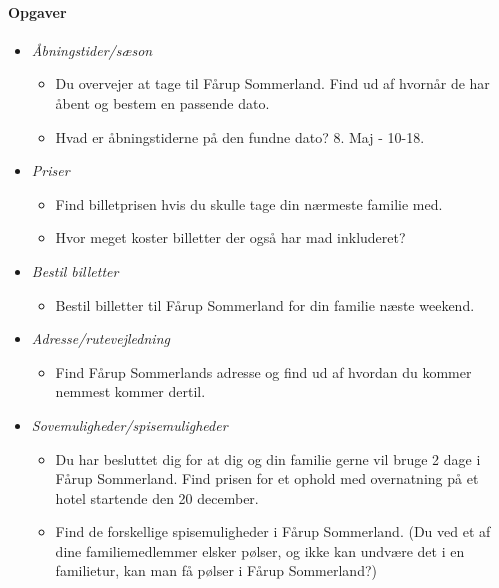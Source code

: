 \documentclass[10pt,a4paper]{article}      %
\begin{document}
\paragraph{Opgaver}
\begin{itemize}
\item {\it Åbningstider/sæson}
    \begin{itemize}
    \item Du overvejer at tage til Fårup Sommerland. Find ud af hvornår de har
    åbent og bestem en passende dato.
    \item Hvad er åbningstiderne på den fundne dato? 8. Maj - 10-18.
    \end{itemize}

\item {\it Priser}
    \begin{itemize}
    \item Find billetprisen hvis du skulle tage din nærmeste familie med.
    \item Hvor meget koster billetter der også har mad inkluderet?
    \end{itemize}

\item {\it Bestil billetter}
    \begin{itemize}
    \item Bestil billetter til Fårup Sommerland for din familie næste weekend.
    \end{itemize}

\item {\it Adresse/rutevejledning}
    \begin{itemize}
    \item Find Fårup Sommerlands adresse og find ud af hvordan du kommer
    nemmest kommer dertil.
    \end{itemize}

\item {\it Sovemuligheder/spisemuligheder}
    \begin{itemize}
    \item Du har besluttet dig for at dig og din familie gerne vil bruge 2 dage
    i Fårup Sommerland. Find prisen for et ophold med overnatning på et hotel
    startende den 20 december.
    \item Find de forskellige spisemuligheder i Fårup Sommerland. (Du ved et af
    dine familiemedlemmer elsker pølser, og ikke kan undvære det i en familietur,
    kan man få pølser i Fårup Sommerland?)
    \end{itemize}


\end{itemize}
\end{document}
